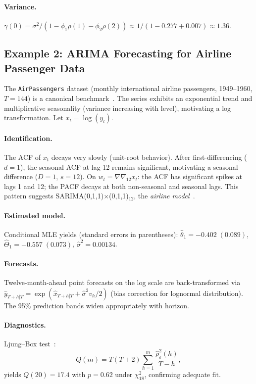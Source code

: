 \documentclass[conference]{IEEEtran}
\theoremstyle{definition}
\begin{document}
\paragraph{Variance.}
$\gamma(0) = \sigma^2/(1 - \phi_1\rho(1) - \phi_2\rho(2)) \approx 1/(1 - 0.277 + 0.007) \approx 1.36$.

\subsection{Example 2: ARIMA Forecasting for Airline Passenger Data}

The \texttt{AirPassengers} dataset (monthly international airline passengers,
1949--1960, $T=144$) is a canonical benchmark~\cite{box2015time}.
The series exhibits an exponential trend and multiplicative seasonality
(variance increasing with level), motivating a log transformation.
Let $x_t = \log(y_t)$.

\paragraph{Identification.}
The ACF of $x_t$ decays very slowly (unit-root behavior). After
first-differencing ($d=1$), the seasonal ACF at lag 12 remains significant,
motivating a seasonal difference ($D=1$, $s=12$). On $w_t = \nabla\nabla_{12}x_t$:
the ACF has significant spikes at lags 1 and 12; the PACF decays at
both non-seasonal and seasonal lags. This pattern suggests SARIMA(0,1,1)$\times$(0,1,1)$_{12}$,
the \emph{airline model}~\cite{box2015time}.

\paragraph{Estimated model.}
Conditional MLE yields (standard errors in parentheses):
$\hat{\theta}_1 = -0.402\;(0.089)$, $\hat{\Theta}_1 = -0.557\;(0.073)$,
$\hat{\sigma}^2 = 0.00134$.

\paragraph{Forecasts.}
Twelve-month-ahead point forecasts on the log scale are back-transformed via
$\hat{y}_{T+h|T} = \exp(\hat{x}_{T+h|T} + \hat{\sigma}^2 v_h / 2)$
(bias correction for lognormal distribution). The 95\% prediction bands widen
appropriately with horizon.

\paragraph{Diagnostics.}
Ljung--Box test~\cite{ljung1978measure}:
\begin{equation}
  Q(m) = T(T+2)\sum_{h=1}^m \frac{\hat{\rho}_\varepsilon^2(h)}{T-h},
  \label{eq:ljungbox}
\end{equation}
yields $Q(20) = 17.4$ with $p = 0.62$ under $\chi^2_{18}$, confirming
adequate fit.
\end{document}
